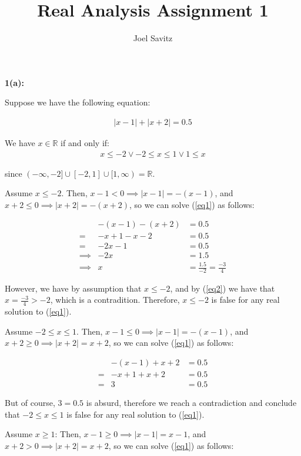 \documentclass{article}
\title{Real Analysis Assignment 1}
\author{Joel Savitz}
\newcommand{\reals}{\mathbb{R}}
\begin{document}
\maketitle

\textbf{1(a):}

Suppose we have the following equation:

\begin{align} \label{eq1}
	|x-1| + |x+2| = 0.5
\end{align}

We have $x \in \reals $ if and only if:
\begin{align} \label{eq0}
	x \le -2 \lor -2 \le x \le 1 \lor 1 \le x
\end{align}

since $(-\infty,-2] \cup [-2,1] \cup [1,\infty) = \reals$.

Assume $x \le -2$.
Then, $x-1 < 0 \implies |x-1| = -(x-1)$,
and $x+2 \le 0 \implies |x+2| = -(x+2)$,
so we can solve (\ref{eq1}) as follows:

\begin{align}
	& -(x-1) -(x+2) & = 0.5 \\
	= & -x+1 -x-2 & = 0.5 \\
	= & -2x-1 & = 0.5 \\
	\implies & -2x & = 1.5 \\
	\label{eq2} \implies & x & = \frac{1.5}{-2} = \frac{-3}{4}
\end{align}

However, we have by assumption that $x \le -2$,
and by (\ref{eq2}) we have that $x = \frac{-3}{4} > -2$,
which is a contradition.
Therefore, $x \le -2$ is false for any real solution to (\ref{eq1}).

Assume $-2 \le x \le 1$.
Then, $x-1 \le 0 \implies |x-1| = -(x-1)$,
and $x+2 \geq 0 \implies |x+2| = x+2$,
so we can solve (\ref{eq1}) as follows:

\begin{align}
	& -(x-1) + x+2 & = 0.5 \\
	= & -x+1 + x+2 & = 0.5 \\
	= & 3 & = 0.5
\end{align}

But of course, $3 = 0.5$ is absurd,
therefore we reach a contradiction
and conclude that $-2 \le x \le 1$ is false for any real solution to (\ref{eq1}).

Assume $x \geq 1$:
Then, $x-1 \geq 0 \implies |x-1| = x-1$,
and $x+2 > 0 \implies |x+2| = x+2$,
so we can solve (\ref{eq1}) as follows:
\end{document}
